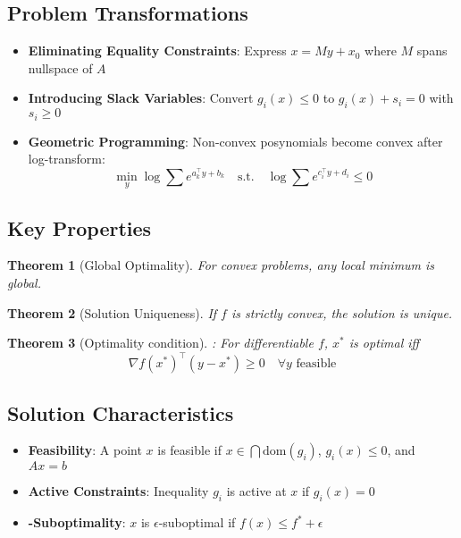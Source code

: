 \documentclass{article}
\theoremstyle{plain}
\newtheorem{theorem}{Theorem}[section]
\begin{document}
\subsection{Problem Transformations} %
\begin{itemize}
    \item \textbf{Eliminating Equality Constraints}:
    Express \( x = My + x_0 \) where \( M \) spans nullspace of \( A \)
    
    \item \textbf{Introducing Slack Variables}:
    Convert \( g_i(x) \leq 0 \) to \( g_i(x) + s_i = 0 \) with \( s_i \geq 0 \)
    
    \item \textbf{Geometric Programming}:
    Non-convex posynomials become convex after log-transform:
    \[
    \min_y \log\sum e^{a_k^\top y + b_k} \quad \text{s.t.} \quad \log\sum e^{c_i^\top y + d_i} \leq 0
    \]
\end{itemize}

\subsection{Key Properties}
\begin{itemize}
    \begin{theorem}[Global Optimality]
For convex problems, any local minimum is global.
\end{theorem}

\begin{theorem}[Solution Uniqueness]
If \( f \) is strictly convex, the solution is unique.
\end{theorem}
    
\begin{theorem}[Optimality condition]: For differentiable \( f \), \( x^* \) is optimal iff
    \[ \nabla f(x^*)^\top (y - x^*) \geq 0 \quad \forall y \text{ feasible} \]
    \end{theorem}
\end{itemize}

\subsection{Solution Characteristics} %
\begin{itemize}
    \item \textbf{Feasibility}: A point \( x \) is feasible if \( x \in \bigcap\text{dom}(g_i) \), \( g_i(x) \leq 0 \), and \( Ax = b \)
    
    \item \textbf{Active Constraints}: Inequality \( g_i \) is active at \( x \) if \( g_i(x) = 0 \)
    
    \item \epsilon\textbf{-Suboptimality}: \( x \) is \( \epsilon \)-suboptimal if \( f(x) \leq f^* + \epsilon \)
\end{itemize}
\end{document}
